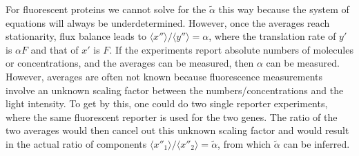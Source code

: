 \documentclass[%
 reprint,prx,
superscriptaddress,
%
%
%
%
%
%
%
%
%
 amsmath,amssymb,
 aps,
%
%
%
%
%
%
]{revtex4-2}
\begin{document}
{{For fluorescent proteins we cannot solve for the $\tilde{\alpha}$ this way because the system of equations will always be underdetermined. However, once the averages reach 
stationarity, flux balance leads to $\langle x'' \rangle /\langle y'' \rangle = \alpha$, where the translation rate of $y'$ is $\alpha F$ and that of $x'$ is $F$. 
If the experiments report absolute numbers of molecules or concentrations, and the averages can be measured, then $\alpha$ can be measured. However, averages are 
often not known because fluorescence measurements involve an unknown scaling factor between the numbers/concentrations and the light intensity. To get by this, one 
could do two single reporter experiments, where the same fluorescent reporter is used for the two genes. The ratio of the two averages would then cancel out this unknown 
scaling factor and would result in the actual ratio of components $\langle x''_{1} \rangle / \langle x''_{2} \rangle = \tilde{\alpha}$, from which $\tilde{\alpha}$ can be inferred. 

}}
\end{document}
